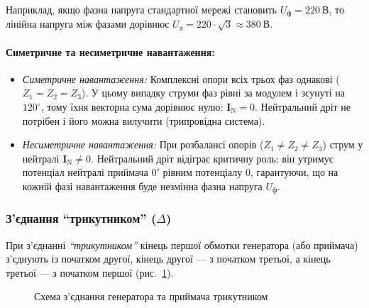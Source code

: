 Наприклад, якщо фазна напруга стандартної мережі становить $U_\text{ф} = 220~\text{В}$, то лінійна напруга між фазами дорівнює $U_\text{л} = 220 \cdot \sqrt{3} \approx 380~\text{В}$.

\paragraph{Симетричне та несиметричне навантаження:}
\begin{itemize}
    \item \emph{Симетричне навантаження:} Комплексні опори всіх трьох фаз однакові ($Z_1 = Z_2 = Z_3$). У цьому випадку струми фаз рівні за модулем і зсунуті на $120^\circ$, тому їхня векторна сума дорівнює нулю: $\mathbf{I}_\text{N} = 0$. Нейтральний дріт не потрібен і його можна вилучити (трипровідна система).
    \item \emph{Несиметричне навантаження:} При розбалансі опорів ($Z_1 \neq Z_2 \neq Z_3$) струм у нейтралі $\mathbf{I}_\text{N} \neq 0$. Нейтральний дріт відіграє критичну роль: він утримує потенціал нейтралі приймача $0'$ рівним потенціалу $0$, гарантуючи, що на кожній фазі навантаження буде незмінна фазна напруга $U_\text{ф}$.
\end{itemize}

\subsubsection*{З'єднання \enquote{трикутником} ($\Delta$)}

При з'єднанні \emph{\enquote{трикутником}} кінець першої обмотки генератора (або приймача) з'єднують із початком другої, кінець другої --- з початком третьої, а кінець третьої --- з початком першої (рис.~\ref{pic:ThreePhaseDelta}).

\begin{figure}[h!]\centering
	\caption{Схема з'єднання генератора та приймача трикутником}
	\label{pic:ThreePhaseDelta}
\end{figure}

